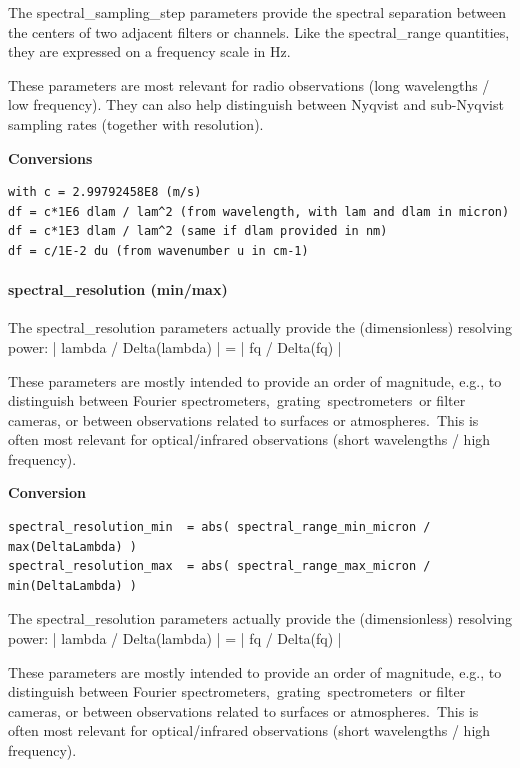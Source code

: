 \documentclass[11pt,a4paper]{ivoa}
\begin{document}
The spectral\_sampling\_step parameters provide the spectral separation between the centers of two adjacent filters or channels. Like the spectral\_range quantities, they are expressed on a frequency scale in Hz. 

These parameters are most relevant for radio observations (long wavelengths / low frequency). They can also help distinguish between Nyqvist and sub-Nyqvist sampling rates (together with resolution).





\textbf{Conversions}




\begin{verbatim}
with c = 2.99792458E8 (m/s)
df = c*1E6 dlam / lam^2 (from wavelength, with lam and dlam in micron)
df = c*1E3 dlam / lam^2 (same if dlam provided in nm)
df = c/1E-2 du (from wavenumber u in cm-1)
\end{verbatim}




\paragraph{spectral\_resolution (min/max)}

The spectral\_resolution parameters actually provide the (dimensionless) resolving power: | lambda / Delta(lambda) | = | fq / Delta(fq) |  

These parameters are mostly intended to provide an order of magnitude, e.g., to distinguish between Fourier spectrometers, grating spectrometers or filter cameras, or between observations related to surfaces or atmospheres. This is often most relevant for optical/infrared observations (short wavelengths / high frequency).





\textbf{Conversion}




\begin{verbatim}
spectral_resolution_min  = abs( spectral_range_min_micron / max(DeltaLambda) )
spectral_resolution_max  = abs( spectral_range_max_micron / min(DeltaLambda) )
\end{verbatim}




The spectral\_resolution parameters actually provide the (dimensionless) resolving power: | lambda / Delta(lambda) | = | fq / Delta(fq) |  

These parameters are mostly intended to provide an order of magnitude, e.g., to distinguish between Fourier spectrometers, grating spectrometers or filter cameras, or between observations related to surfaces or atmospheres. This is often most relevant for optical/infrared observations (short wavelengths / high frequency).
\end{document}
